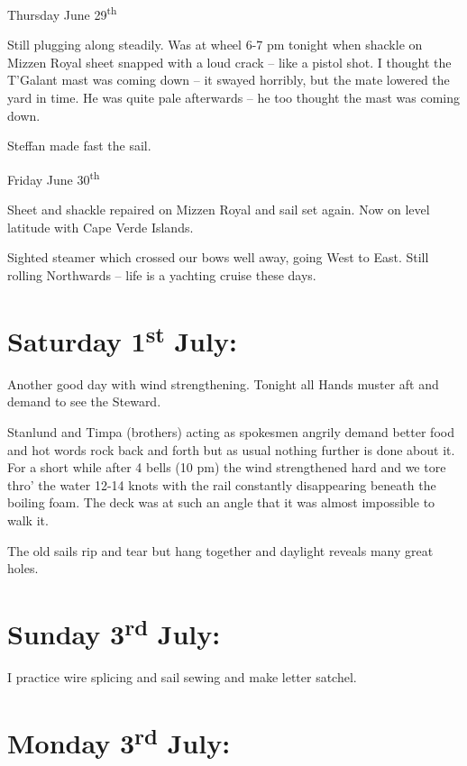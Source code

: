 \documentclass[
  11pt,
  msmallroyalvopaper
]{memoir}
\begin{document}
Thursday June 29\textsuperscript{th}

Still plugging along steadily. Was at wheel 6-7 pm tonight when shackle
on Mizzen Royal sheet snapped with a loud crack -- like a pistol shot. I
thought the T'Galant mast was coming down -- it swayed horribly, but the
mate lowered the yard in time. He was quite pale afterwards -- he too
thought the mast was coming down.

Steffan made fast the sail.

Friday June 30\textsuperscript{th}

Sheet and shackle repaired on Mizzen Royal and sail set again. Now on
level latitude with Cape Verde Islands.

Sighted steamer which crossed our bows well away, going West to East.
Still rolling Northwards -- life is a yachting cruise these days.

\hypertarget{saturday-1st-july}{%
\section{\texorpdfstring{Saturday 1\textsuperscript{st}
July:}{Saturday 1st July:}}\label{saturday-1st-july}}

Another good day with wind strengthening. Tonight all Hands muster aft
and demand to see the Steward.

Stanlund and Timpa (brothers) acting as spokesmen angrily demand better
food and hot words rock back and forth but as usual nothing further is
done about it. For a short while after 4 bells (10 pm) the wind
strengthened hard and we tore thro' the water 12-14 knots with the rail
constantly disappearing beneath the boiling foam. The deck was at such
an angle that it was almost impossible to walk it.

The old sails rip and tear but hang together and daylight reveals many
great holes.

\hypertarget{sunday-3rd-july}{%
\section{\texorpdfstring{Sunday 3\textsuperscript{rd}
July:}{Sunday 3rd July:}}\label{sunday-3rd-july}}

I practice wire splicing and sail sewing and make letter satchel.

\hypertarget{monday-3rd-july}{%
\section{\texorpdfstring{Monday 3\textsuperscript{rd}
July:}{Monday 3rd July:}}\label{monday-3rd-july}}
\end{document}

